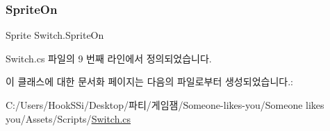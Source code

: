 \subsubsection{\texorpdfstring{SpriteOn}{SpriteOn}}
{\footnotesize\ttfamily Sprite Switch.\+Sprite\+On}



Switch.\+cs 파일의 9 번째 라인에서 정의되었습니다.



이 클래스에 대한 문서화 페이지는 다음의 파일로부터 생성되었습니다.\+:\begin{DoxyCompactItemize}
\item 
C\+:/\+Users/\+Hook\+S\+Si/\+Desktop/파티/게임잼/\+Someone-\/likes-\/you/\+Someone likes you/\+Assets/\+Scripts/\mbox{\hyperlink{_switch_8cs}{Switch.\+cs}}\end{DoxyCompactItemize}
